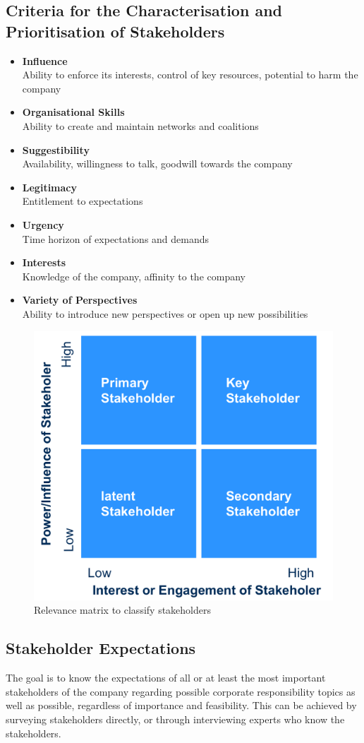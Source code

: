 \documentclass[11pt]{article}
\theoremstyle{definition}
\begin{document}
\subsection{Criteria for the Characterisation and Prioritisation of Stakeholders}
\begin{itemize}
	\item \textbf{Influence}\\
	Ability to enforce its interests, control of key resources, potential to harm the company
	\item \textbf{Organisational Skills}\\
	Ability to create and maintain networks and coalitions
	\item \textbf{Suggestibility}\\
	Availability, willingness to talk, goodwill towards the company
	\item \textbf{Legitimacy}\\
	Entitlement to expectations
	\item \textbf{Urgency}\\
	Time horizon of expectations and demands
	\item \textbf{Interests}\\
	Knowledge of the company, affinity to the company
	\item \textbf{Variety of Perspectives}\\
	Ability to introduce new perspectives or open up new possibilities
\end{itemize}

\begin{figure}[H]
	\centering
	\includegraphics[width=0.5\linewidth]{img/corporate_responsibility_stakeholder_prioritisation}
	\caption{Relevance matrix to classify stakeholders \parencite{winistorfer2012management}}
	\label{fig:corporateresponsibilitystakeholderprioritisation}
\end{figure}

\subsection{Stakeholder Expectations}
The goal is to know the expectations of all or at least the most important stakeholders of the company regarding possible corporate responsibility topics as well as possible, regardless of importance and feasibility. This can be achieved by surveying stakeholders directly, or through interviewing experts who know the stakeholders.
\end{document}
